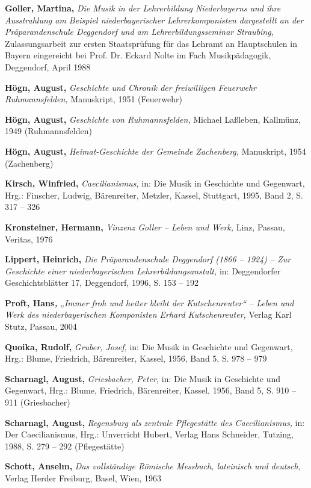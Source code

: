 \documentclass[a4paper]{article}
\begin{document}
\textbf{Goller, Martina,} \textit{Die Musik in der Lehrerbildung
Niederbayerns und ihre Ausstrahlung am Beispiel niederbayerischer
Lehrerkomponisten dargestellt an der Präparandenschule Deggendorf und
am Lehrerbildungsseminar Straubing,} Zulassungsarbeit zur ersten
Staatsprüfung für das Lehramt an Hauptschulen in Bayern eingereicht bei
Prof. Dr. Eckard Nolte im Fach Musikpädagogik, Deggendorf, April 1988

\textbf{Högn, August,} \textit{Geschichte und Chronik der freiwilligen
Feuerwehr Ruhmannsfelden,} Manuskript, 1951 (Feuerwehr)

\textbf{Högn, August,} \textit{Geschichte von Ruhmannsfelden,} Michael
Laßleben, Kallmünz, 1949 (Ruhmannsfelden)

\textbf{Högn, August,} \textit{Heimat-Geschichte der Gemeinde
Zachenberg,} Manuskript, 1954 (Zachenberg)

\textbf{Kirsch, Winfried,} \textit{Caecilianismus,} in: Die Musik in
Geschichte und Gegenwart, Hrg.: Finscher, Ludwig, Bärenreiter, Metzler,
Kassel, Stuttgart, 1995, Band 2, S. 317 – 326

\textbf{Kronsteiner, Hermann,} \textit{Vinzenz Goller – Leben und Werk,}
Linz, Passau, Veritas, 1976

\textbf{Lippert, Heinrich,} \textit{Die Präparandenschule Deggendorf
(1866 – 1924) – Zur Geschichte einer niederbayerischen
Lehrerbildungsanstalt,} in: Deggendorfer Geschichtsblätter 17,
Deggendorf, 1996, S. 153 – 192

\textbf{Proft, Hans}\textbf{\textit{,}}\textit{ „Immer froh und heiter
bleibt der Kutschenreuter“ – Leben und Werk des niederbayerischen
Komponisten Erhard Kutschenreuter,} Verlag Karl Stutz, Passau, 2004

\textbf{Quoika, Rudolf,} \textit{Gruber, Josef,} in: Die Musik in
Geschichte und Gegenwart, Hrg.: Blume, Friedrich, Bärenreiter, Kassel,
1956, Band 5, S. 978 – 979

\textbf{Scharnagl, August,} \textit{Griesbacher, Peter,} in: Die Musik
in Geschichte und Gegenwart, Hrg.: Blume, Friedrich, Bärenreiter,
Kassel, 1956, Band 5, S. 910 – 911 (Griesbacher)

\textbf{Scharnagl, August,} \textit{Regensburg als zentrale Pflegestätte
des Caecilianismus,} in: Der Caecilianismus, Hrg.: Unverricht Hubert,
Verlag Hans Schneider, Tutzing, 1988, S. 279 – 292 (Pflegestätte)

\textbf{Schott, Anselm,} \textit{Das vollständige Römische Messbuch,
lateinisch und deutsch,} Verlag Herder Freiburg, Basel, Wien, 1963
\end{document}

